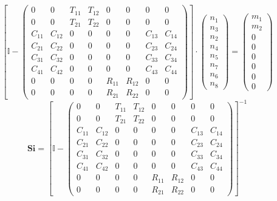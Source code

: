 \[ \left[ \mathbb{I}  - \left(\begin{smallmatrix} 0 & 0 & T_{11} & T_{12} & 0 & 0 & 0 & 0 \\ 0 & 0 & T_{21} & T_{22} & 0 & 0 & 0 & 0 \\ C_{11} & C_{12} & 0 & 0 & 0 & 0 & C_{13} & C_{14} \\ C_{21} & C_{22} & 0 & 0 & 0 & 0 & C_{23} & C_{24} \\ C_{31} & C_{32} & 0 & 0 & 0 & 0 & C_{33} & C_{34} \\ C_{41} & C_{42} & 0 & 0 & 0 & 0 & C_{43} & C_{44} \\ 0 & 0 & 0 & 0 & R_{11} & R_{12} & 0 & 0 \\ 0 & 0 & 0 & 0 & R_{21} & R_{22} & 0 & 0 \end{smallmatrix}\right)\right] \cdot \left(\begin{smallmatrix} n_{1} \\ n_{3} \\ n_{2} \\ n_{4} \\ n_{5} \\ n_{7} \\ n_{6} \\ n_{8} \end{smallmatrix}\right) = \left(\begin{smallmatrix} m_{1} \\ m_{2} \\ 0 \\ 0 \\ 0 \\ 0 \\ 0 \\ 0 \end{smallmatrix}\right) \]
\[ \mathbf{Si} = \left[ \mathbb{I}  - \left(\begin{smallmatrix} 0 & 0 & T_{11} & T_{12} & 0 & 0 & 0 & 0 \\ 0 & 0 & T_{21} & T_{22} & 0 & 0 & 0 & 0 \\ C_{11} & C_{12} & 0 & 0 & 0 & 0 & C_{13} & C_{14} \\ C_{21} & C_{22} & 0 & 0 & 0 & 0 & C_{23} & C_{24} \\ C_{31} & C_{32} & 0 & 0 & 0 & 0 & C_{33} & C_{34} \\ C_{41} & C_{42} & 0 & 0 & 0 & 0 & C_{43} & C_{44} \\ 0 & 0 & 0 & 0 & R_{11} & R_{12} & 0 & 0 \\ 0 & 0 & 0 & 0 & R_{21} & R_{22} & 0 & 0 \end{smallmatrix}\right) \right]^{-1} \]

